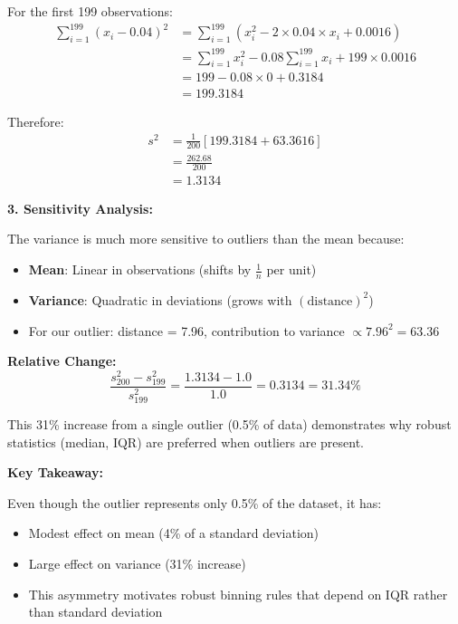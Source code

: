 \documentclass[12pt]{article}
\begin{document}
\begin{explanation}
For the first 199 observations:
\begin{align*}
\sum_{i=1}^{199}(x_i - 0.04)^2 &= \sum_{i=1}^{199}(x_i^2 - 2 \times 0.04 \times x_i + 0.0016) \\
&= \sum_{i=1}^{199}x_i^2 - 0.08\sum_{i=1}^{199}x_i + 199 \times 0.0016 \\
&= 199 - 0.08 \times 0 + 0.3184 \\
&= 199.3184
\end{align*}

Therefore:
\begin{align*}
s^2 &= \frac{1}{200}\left[199.3184 + 63.3616\right] \\
&= \frac{262.68}{200} \\
&= 1.3134
\end{align*}

\textbf{3. Sensitivity Analysis:}

The variance is much more sensitive to outliers than the mean because:

\begin{itemize}
    \item \textbf{Mean}: Linear in observations (shifts by \(\frac{1}{n}\) per unit)
    \item \textbf{Variance}: Quadratic in deviations (grows with \((\text{distance})^2\))
    \item For our outlier: distance = 7.96, contribution to variance \(\propto 7.96^2 = 63.36\)
\end{itemize}

\textbf{Relative Change:}
\[
\frac{s_{200}^2 - s_{199}^2}{s_{199}^2} = \frac{1.3134 - 1.0}{1.0} = 0.3134 = 31.34\%
\]

This 31\% increase from a single outlier (0.5\% of data) demonstrates why robust statistics (median, IQR) are preferred when outliers are present.

\textbf{Key Takeaway:}

Even though the outlier represents only 0.5\% of the dataset, it has:
\begin{itemize}
    \item Modest effect on mean (4\% of a standard deviation)
    \item Large effect on variance (31\% increase)
    \item This asymmetry motivates robust binning rules that depend on IQR rather than standard deviation
\end{itemize}
\end{explanation}
\end{document}

